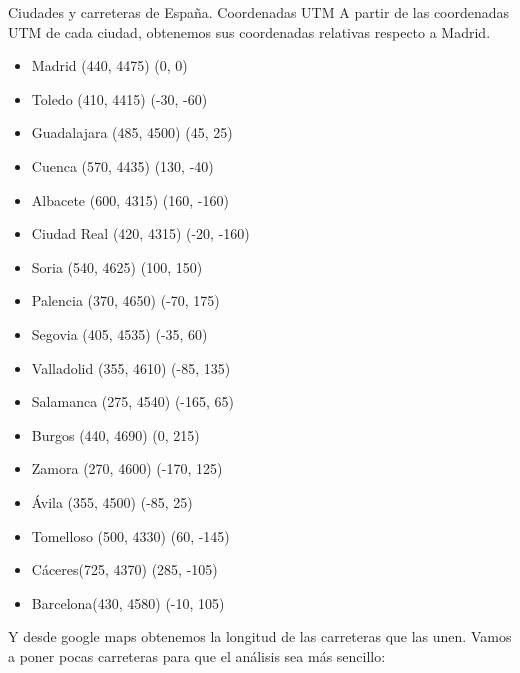 \documentclass[11pt, a4paper, spanish, openright, twoside]{book}
\begin{document}
	\begin{section}{Ciudades y carreteras de España. Coordenadas UTM}
		A partir de las coordenadas UTM de cada ciudad, obtenemos sus coordenadas relativas respecto a Madrid.
		\begin{itemize}
		\item Madrid	(440, 4475)		\textrightarrow	(0, 0)

		\item Toledo	(410, 4415)		\textrightarrow	(-30, -60)
		\item Guadalajara	(485, 4500)	\textrightarrow	(45, 25)
		\item Cuenca	(570,  4435)		\textrightarrow	(130, -40)
		\item Albacete	(600, 4315)	\textrightarrow	(160, -160)
		\item Ciudad Real 	(420, 4315)	\textrightarrow	(-20, -160)

		\item Soria	(540, 4625)		\textrightarrow	(100, 150)
		\item Palencia	(370, 4650)  	\textrightarrow	(-70, 175)
		\item Segovia	(405, 4535)	\textrightarrow	(-35, 60)
		\item Valladolid	(355, 4610)	\textrightarrow	(-85, 135)
		\item Salamanca	(275, 4540)	\textrightarrow	(-165, 65)
		\item Burgos	(440, 4690)		\textrightarrow	(0, 215)
		\item Zamora	(270, 4600)		\textrightarrow	(-170, 125)
		\item Ávila	(355, 4500)		\textrightarrow	(-85, 25)
		\item Tomelloso	(500, 4330)  	\textrightarrow	(60, -145)
		
		\item Cáceres(725, 4370)		\textrightarrow	(285, -105)	
		\item Barcelona(430, 4580)	\textrightarrow	(-10, 105)

		\end{itemize}

		Y desde google maps obtenemos la longitud de las carreteras que las unen. Vamos a poner pocas carreteras para que el análisis sea más sencillo:


\end{section}
\end{document}
